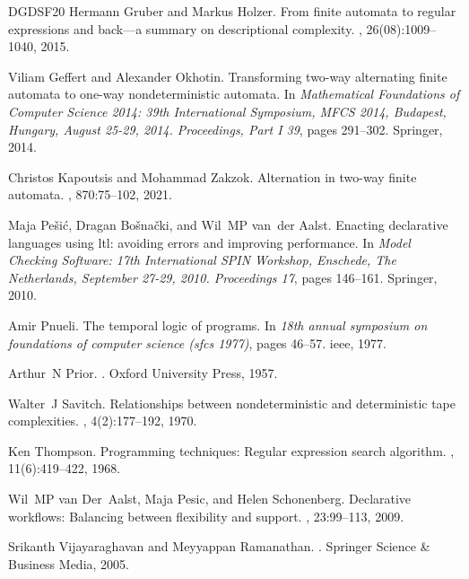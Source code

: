 \documentclass[10pt,a4paper]{amsart}
\theoremstyle{plain}
\theoremstyle{definition}
\theoremstyle{definition}
\DeclareMathOperator{\?}{?}
\begin{document}
\begin{thebibliography}{DGDSF{\etalchar{+}}20}
Hermann Gruber and Markus Holzer.
\newblock From finite automata to regular expressions and back—a summary on descriptional complexity.
, 26(08):1009--1040, 2015.

Viliam Geffert and Alexander Okhotin.
\newblock Transforming two-way alternating finite automata to one-way nondeterministic automata.
\newblock In {\em Mathematical Foundations of Computer Science 2014: 39th International Symposium, MFCS 2014, Budapest, Hungary, August 25-29, 2014. Proceedings, Part I 39}, pages 291--302. Springer, 2014.

Christos Kapoutsis and Mohammad Zakzok.
\newblock Alternation in two-way finite automata.
, 870:75--102, 2021.

Maja Pe{\v{s}}i{\'c}, Dragan Bo{\v{s}}na{\v{c}}ki, and Wil~MP van~der Aalst.
\newblock Enacting declarative languages using ltl: avoiding errors and improving performance.
\newblock In {\em Model Checking Software: 17th International SPIN Workshop, Enschede, The Netherlands, September 27-29, 2010. Proceedings 17}, pages 146--161. Springer, 2010.

Amir Pnueli.
\newblock The temporal logic of programs.
\newblock In {\em 18th annual symposium on foundations of computer science (sfcs 1977)}, pages 46--57. ieee, 1977.

Arthur~N Prior.
.
\newblock Oxford University Press, 1957.

Walter~J Savitch.
\newblock Relationships between nondeterministic and deterministic tape complexities.
, 4(2):177--192, 1970.

Ken Thompson.
\newblock Programming techniques: Regular expression search algorithm.
, 11(6):419--422, 1968.

Wil~MP van Der~Aalst, Maja Pesic, and Helen Schonenberg.
\newblock Declarative workflows: Balancing between flexibility and support.
, 23:99--113, 2009.

Srikanth Vijayaraghavan and Meyyappan Ramanathan.
.
\newblock Springer Science \& Business Media, 2005.


\end{thebibliography}
\end{document}
